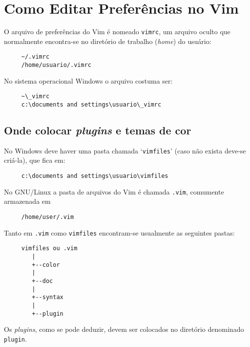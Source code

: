 
\chapter{Como Editar Preferências no Vim}\label{cha:Como editar preferências no Vim}

O arquivo de preferências do Vim é nomeado {\tt vimrc}, um arquivo oculto que
normalmente encontra-se no diretório de trabalho ({\em home}) do usuário:

\begin{verbatim}
     ~/.vimrc
     /home/usuario/.vimrc
\end{verbatim}

No sistema operacional Windows o arquivo costuma ser:

\begin{verbatim}
     ~\_vimrc
     c:\documents and settings\usuario\_vimrc
\end{verbatim}

\section{Onde colocar {\em plugins} e temas de cor}
\label{Onde colocar plugins e temas de cor}

No Windows deve haver uma pasta chamada `{\tt vimfiles}' (caso não exista
deve-se criá-la), que fica em:

\begin{verbatim}
     c:\documents and settings\usuario\vimfiles
\end{verbatim}

No GNU/Linux a pasta de arquivos do Vim é chamada {\tt .vim}, comumente
armazenada em

\begin{verbatim}
     /home/user/.vim
\end{verbatim}

Tanto em {\tt .vim} como {\tt vimfiles} encontram-se usualmente as seguintes
pastas:

\begin{verbatim}
     vimfiles ou .vim
        |
        +--color
        |
        +--doc
        |
        +--syntax
        |
        +--plugin
\end{verbatim}

Os {\em plugins}, como se pode deduzir, devem ser colocados no diretório
denominado {\tt plugin}.

